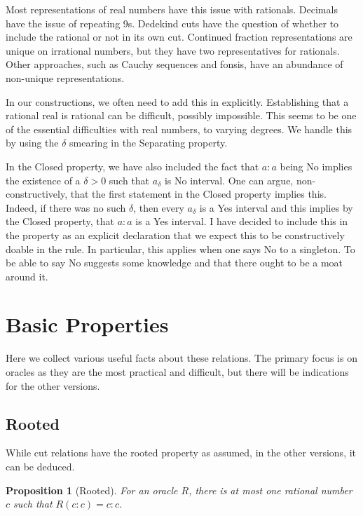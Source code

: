 \documentclass[12pt]{article}
\newtheorem{proposition}{Proposition}[subsection]
\begin{document}
    Most representations of real numbers have this issue with rationals. Decimals have the issue of repeating 9s. Dedekind cuts have the question of whether to include the rational or not in its own cut. Continued fraction representations are unique on irrational numbers, but they have two representatives for rationals. Other approaches, such as Cauchy sequences and fonsis, have an abundance of non-unique representations. 
    
    In our constructions, we often need to add this in explicitly. Establishing that a rational real is rational can be difficult, possibly impossible. This seems to be one of the essential difficulties with real numbers, to varying degrees. We handle this by using the $\delta$ smearing in the Separating property. 

    In the Closed property, we have also included the fact that $a:a$ being No implies the existence of a $\delta > 0$ such that $a_\delta$ is No interval. One can argue, non-constructively, that the first statement in the Closed property implies this. Indeed, if there was no such $\delta$, then every $a_\delta$ is a Yes interval and this implies by the Closed property, that $a:a$ is a Yes interval. I have decided to include this in the property as an explicit declaration that we expect this to be constructively doable in the rule.  In particular, this applies when one says No to a singleton. To be able to say No suggests some knowledge and that there ought to be a moat around it. 
\section{Basic Properties}

Here we collect various useful facts about these relations. The primary focus is on oracles as they are the most practical and difficult, but there will be indications for the other versions. 

\subsection{Rooted}

While cut relations have the rooted property as assumed, in the other versions, it can be deduced. 

\begin{proposition}[Rooted]\label{pr:rooted}
    For an oracle $R$, there is at most one rational number $c$ such that $R(c:c)= c:c$.
\end{proposition}
\end{document}
